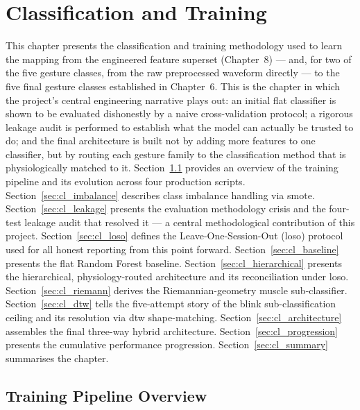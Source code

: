 \chapter{Classification and Training}
\label{ch:classification}

This chapter presents the classification and training methodology
used to learn the mapping from the engineered feature superset
(Chapter~8) --- and, for two of the five gesture classes, from the
raw preprocessed waveform directly --- to the five final gesture
classes established in Chapter~6. This is the chapter in which the
project's central engineering narrative plays out: an initial flat
classifier is shown to be evaluated dishonestly by a naive
cross-validation protocol; a rigorous leakage audit is performed to
establish what the model can actually be trusted to do; and the
final architecture is built not by adding more features to one
classifier, but by routing each gesture family to the
classification method that is physiologically matched to it.
Section~\ref{sec:cl_overview} provides an overview of the training
pipeline and its evolution across four production scripts.
Section~\ref{sec:cl_imbalance} describes class imbalance handling
via \acrshort{smote}. Section~\ref{sec:cl_leakage} presents the
evaluation methodology crisis and the four-test leakage audit that
resolved it --- a central methodological contribution of this
project. Section~\ref{sec:cl_loso} defines the
Leave-One-Session-Out (\acrshort{loso}) protocol used for all
honest reporting from this point forward.
Section~\ref{sec:cl_baseline} presents the flat Random Forest
baseline. Section~\ref{sec:cl_hierarchical} presents the
hierarchical, physiology-routed architecture and its reconciliation
under \acrshort{loso}. Section~\ref{sec:cl_riemann} derives the
Riemannian-geometry muscle sub-classifier. Section~\ref{sec:cl_dtw}
tells the five-attempt story of the blink sub-classification
ceiling and its resolution via \acrshort{dtw} shape-matching.
Section~\ref{sec:cl_architecture} assembles the final three-way
hybrid architecture. Section~\ref{sec:cl_progression} presents the
cumulative performance progression. Section~\ref{sec:cl_summary}
summarises the chapter.

\section{Training Pipeline Overview}
\label{sec:cl_overview}

